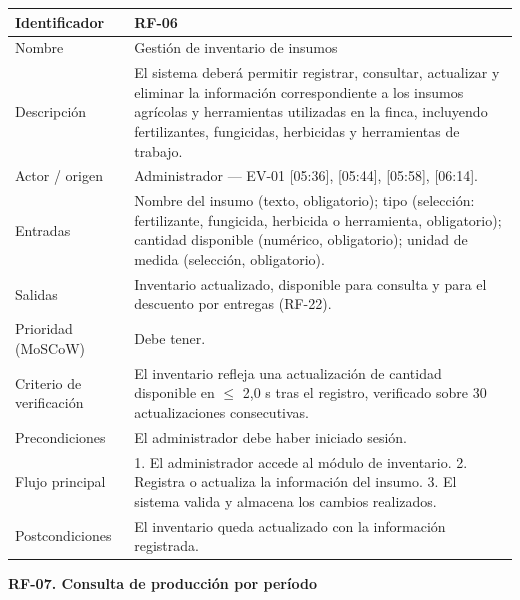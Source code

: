 \documentclass[12pt,a4paper]{article}
\begin{document}
\begin{center}
\begin{longtable}{|p{3.5cm}|p{10.7cm}|}
\hline
Identificador & RF-06 \\
\hline
Nombre & Gestión de inventario de insumos \\
\hline
Descripción & El sistema deberá permitir registrar, consultar, actualizar y eliminar la información correspondiente a los insumos agrícolas y herramientas utilizadas en la finca, incluyendo fertilizantes, fungicidas, herbicidas y herramientas de trabajo. \\
\hline
Actor / origen & Administrador --- EV-01 [05:36], [05:44], [05:58], [06:14]. \\
\hline
Entradas & Nombre del insumo (texto, obligatorio); tipo (selección: fertilizante, fungicida, herbicida o herramienta, obligatorio); cantidad disponible (numérico, obligatorio); unidad de medida (selección, obligatorio). \\
\hline
Salidas & Inventario actualizado, disponible para consulta y para el descuento por entregas (RF-22). \\
\hline
Prioridad (MoSCoW) & Debe tener. \\
\hline
Criterio de verificación & El inventario refleja una actualización de cantidad disponible en $\leq$ 2,0 s tras el registro, verificado sobre 30 actualizaciones consecutivas. \\
\hline
Precondiciones & El administrador debe haber iniciado sesión. \\
\hline
Flujo principal & 1. El administrador accede al módulo de inventario. 2. Registra o actualiza la información del insumo. 3. El sistema valida y almacena los cambios realizados. \\
\hline
Postcondiciones & El inventario queda actualizado con la información registrada. \\
\hline
\end{longtable}
\end{center}

\bigskip
\noindent\textbf{RF-07. Consulta de producción por período}
\label{tab:RF-07}
\end{document}
